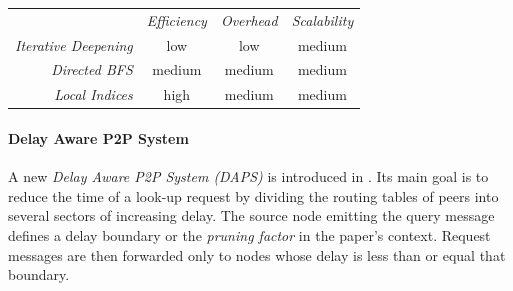 \begin{center}
\begin{tabular}{rccc}
\multicolumn{1}{r}{} &
\multicolumn{1}{c}{\emph{Efficiency}} &
\multicolumn{1}{c}{\emph{Overhead}} &
\multicolumn{1}{c}{\emph{Scalability}}
\\
\cline{2-4}
\emph{Iterative Deepening} &
low &
low &
% 
medium \\
\emph{Directed BFS} &
medium &
medium &
medium \\
\emph{Local Indices} &
high &
medium &
medium \\
\end{tabular}
\end{center}

\paragraph*{ \bf Delay Aware P2P System}
A new \emph{Delay Aware P2P System (DAPS)} is introduced in \cite{ZL2005}. Its
main goal is to reduce the time of a look-up request by dividing the routing
tables of peers into several sectors of increasing delay. The source node
emitting the query message defines a delay boundary or the \emph{pruning
factor} in the paper's context. Request messages are then forwarded only to
nodes whose delay is less than or equal that boundary. 

